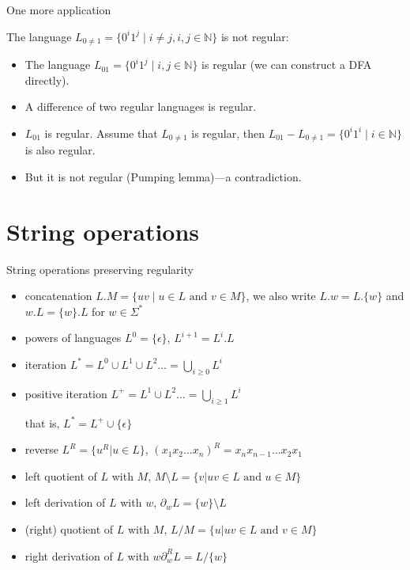 \documentclass[handout]{beamer}
\begin{document}
\begin{frame}{One more application}

    \begin{example}
        The language $L_{0\neq 1}=\{0^i1^j\mid i\neq j, i,j\in\mathbb N\}$ is not regular:
    \end{example}
    \begin{itemize}
        \item The language $L_{01}=\{0^i1^j\mid i,j\in\mathbb N\}$ is regular (we can construct a DFA directly).
        \item A difference of two regular languages is regular.
        \item $L_{01}$ is regular. Assume that $L_{0\neq 1}$ is regular, then $L_{01}-L_{0\neq 1}=\{0^i1^i\mid i\in\mathbb N\}$ is also regular.
        \item But it is not regular (Pumping lemma)---a contradiction.
    \end{itemize}

\end{frame}


\section{String operations}


\begin{frame}{String operations preserving regularity}
    
    \begin{itemize}
        \item \alert{concatenation} $L.M=\{uv\mid u\in L\text{ and }v\in M\}$, we also write $L.w=L.\{w\}$ and $w.L=\{w\}.L$ for $w\in \Sigma^*$
        \item \alert{powers} of languages $L^0=\{\epsilon\}$, $L^{i+1}=L^i.L$
        \item \alert{iteration} $L^*=L^0\cup L^1\cup L^2 \ldots=\bigcup_{i\geq 0}L^i$
        \item \alert{positive iteration} $L^+=L^1\cup L^2 \ldots=\bigcup_{i\geq 1}L^i$
        
        that is, $L^*=L^+\cup \{\epsilon\}$
        \item \alert{reverse} $L^R=\{u^R| u\in L\}$, $(x_1x_2\ldots x_n)^R=x_nx_{n-1}\ldots x_2x_1$
        \item \alert{left quotient} of $L$ with $M$,  $M\setminus L=\{v|uv\in L\text{ and }u\in M\}$
        \item \alert{left derivation} of $L$ with $w$, $\partial_w L=\{w\}\setminus L$
        \item \alert{(right) quotient} of $L$ with $M$, $L/ M=\{u|uv\in L\text{ and }v\in M\}$
        \item \alert{right derivation} of $L$ with $w$$\partial_w^R L=L/\{w\}$
    \end{itemize}
\end{frame}
\end{document}
